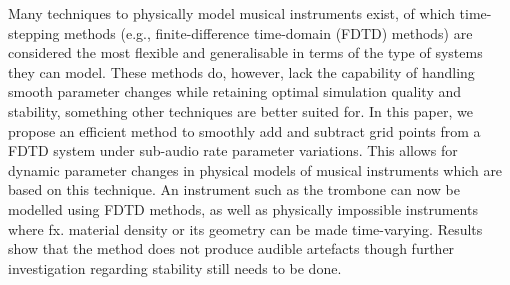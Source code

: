 Many techniques to physically model musical instruments exist, of which time-stepping methods (e.g., finite-difference time-domain (FDTD) methods) are considered the most flexible and generalisable in terms of the type of systems they can model. These methods do, however, lack the capability of handling smooth parameter changes %
while retaining optimal simulation quality and stability, something other techniques are better suited for.   In this paper, we propose an efficient method to smoothly add and subtract grid points from a FDTD system under sub-audio rate parameter variations. This allows for dynamic parameter changes in physical models of musical instruments which are based on this technique. An instrument such as the trombone can now be modelled using FDTD methods, as well as physically impossible instruments where fx. material density or its geometry can be made time-varying. Results show that the method does not produce audible artefacts though further investigation regarding stability still needs to be done.

